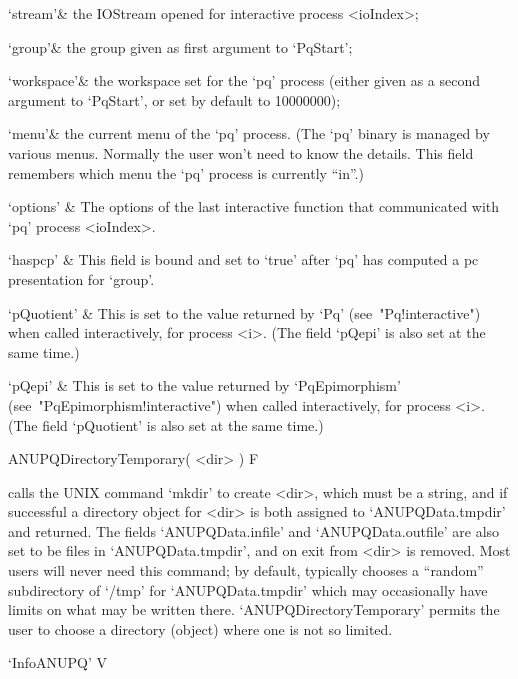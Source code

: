 \beginitems

\quad`stream'& the  IOStream  opened  for  interactive  {\ANUPQ}  process
<ioIndex>;

\quad`group'& the group given as first argument to `PqStart';

\quad`workspace'& the workspace set for the `pq' process (either given as
a second argument to `PqStart', or set by default to 10000000);

\quad`menu'& the current menu of the `pq' process. (The  `pq'  binary  is
managed by various menus. Normally  the  user  won't  need  to  know  the
details. This field remembers which menu the `pq'  process  is  currently
``in''.)

\quad`options' & The  options  of  the  last  interactive  function  that
communicated with `pq' process <ioIndex>.

\quad`haspcp' & This field is bound and set  to  `true'  after  `pq'  has
computed a pc presentation for `group'.

\quad`pQuotient'  &  This  is  set  to  the  value   returned   by   `Pq'
(see~"Pq!interactive") when called interactively, for process  <i>.  (The
field `pQepi' is also set at the same time.)

\quad`pQepi' & This is set  to  the  value  returned  by  `PqEpimorphism'
(see~"PqEpimorphism!interactive") when called interactively, for  process
<i>. (The field `pQuotient' is also set at the same time.)

\enditems

\>ANUPQDirectoryTemporary( <dir> ) F

calls the UNIX command `mkdir' to create <dir>, which must be  a  string,
and if successful a directory  object  for  <dir>  is  both  assigned  to
`ANUPQData.tmpdir'  and  returned.  The  fields  `ANUPQData.infile'   and
`ANUPQData.outfile' are also set to be files in  `ANUPQData.tmpdir',  and
on exit from {\GAP} <dir> is removed. Most users  will  never  need  this
command; by default, {\GAP} typically chooses a  ``random''  subdirectory
of `/tmp' for `ANUPQData.tmpdir' which may occasionally  have  limits  on
what may be written there. `ANUPQDirectoryTemporary' permits the user  to
choose a directory (object) where one is not so limited.


\>`InfoANUPQ' V

